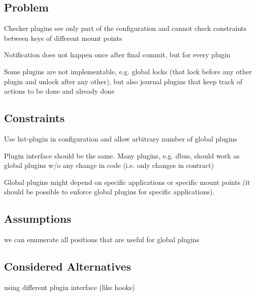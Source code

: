 \subsection*{Problem}


\begin{DoxyItemize}
\item Checker plugins see only part of the configuration and cannot check constraints between keys of different mount points
\item Notification does not happen once after final commit, but for every plugin
\item Some plugins are not implementable, e.\+g. global locks (that lock before any other plugin and unlock after any other), but also journal plugins that keep track of actions to be done and already done
\end{DoxyItemize}

\subsection*{Constraints}


\begin{DoxyItemize}
\item Use list-\/plugin in configuration and allow arbitrary number of global plugins
\item Plugin interface should be the same. Many plugins, e.\+g. dbus, should work as global plugins w/o any change in code (i.\+e. only changes in contract)
\item Global plugins might depend on specific applications or specific mount points (it should be possible to enforce global plugins for specific applications).
\end{DoxyItemize}

\subsection*{Assumptions}


\begin{DoxyItemize}
\item we can enumerate all positions that are useful for global plugins
\end{DoxyItemize}

\subsection*{Considered Alternatives}


\begin{DoxyItemize}
\item using different plugin interface (like hooks)
\end{DoxyItemize}

